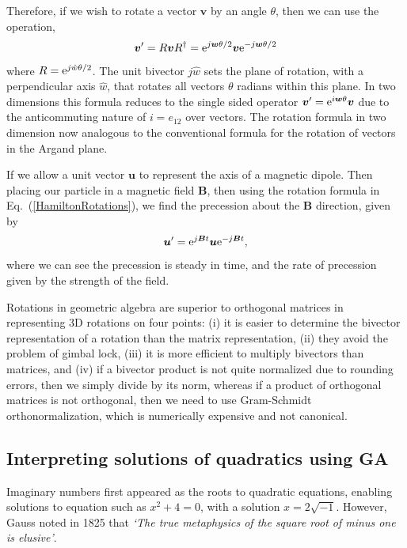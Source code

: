 \documentclass[prb,preprint]{revtex4}
\newcommand{\be}{\begin{equation}}
\newcommand{\ee}{\end{equation}}
\newcommand{\rme}{{\rm{e}}}
\newcommand{\iGA}{{j}}
\newcommand{\iGAT}{{i}}
\newcommand{\reversion}[1] { {#1}^{\dagger} }
\begin{document}
Therefore, if we wish to rotate a vector $ \boldsymbol{v} $ by an angle $ \theta $, then we can use the operation, 
\be \label{HamiltonRotations}
\boldsymbol{v}' = R \boldsymbol{v} \reversion{R} = \rme^{ \iGA \boldsymbol{w} \theta/2}  \boldsymbol{v} \rme^{ -\iGA \boldsymbol{w} \theta/2}
\ee
where $ R = \rme^{ \iGA \hat{w} \theta/2} $. The unit bivector $ \iGA \hat{w} $ sets the plane of rotation, with a perpendicular axis $ \hat{w} $, that rotates all vectors $ \theta $ radians within this plane.  In two dimensions this formula reduces to the single sided operator $ \boldsymbol{v}' = \rme^{ \iGAT \boldsymbol{w} \theta}  \boldsymbol{v} $ due to the anticommuting nature of $ \iGAT = e_{12} $ over vectors. The rotation formula in two dimension now analogous to the conventional formula for the rotation of vectors in the Argand plane.

If we allow a unit vector $ \boldsymbol{u} $ to represent the axis of a magnetic dipole.  
Then placing our particle in a magnetic field $ \boldsymbol{B} $, then using the rotation formula in Eq.~(\ref{HamiltonRotations}), we find the precession about the $ \boldsymbol{B} $ direction, given by
\be
\boldsymbol{u}' = \rme^{ \iGA \boldsymbol{B} t} \boldsymbol{u}  \rme^{ - \iGA \boldsymbol{B} t} ,
\ee
where we can see the precession is steady in time, and the rate of precession given by the strength of the field.


Rotations in geometric algebra are superior to orthogonal matrices in representing 3D rotations on four points: (i) it
is easier to determine the bivector representation of a rotation than the matrix representation, (ii) they avoid the problem of gimbal lock, (iii) it is more efficient to multiply bivectors than matrices, and (iv) if a
bivector product is not quite normalized due to rounding errors, then we simply divide by its norm, whereas if a product of orthogonal matrices is not orthogonal, then we need to use Gram-Schmidt orthonormalization, which is numerically expensive and not canonical.


\subsection{Interpreting solutions of quadratics using GA}

Imaginary numbers first appeared as the roots to quadratic equations, enabling solutions to equation such as $ x^2 + 4 = 0 $, with a solution $ x = 2 \sqrt{-1} $.  However, Gauss noted in 1825 that {\it{`The true metaphysics of the square root of minus one is elusive'}}.
\end{document}
